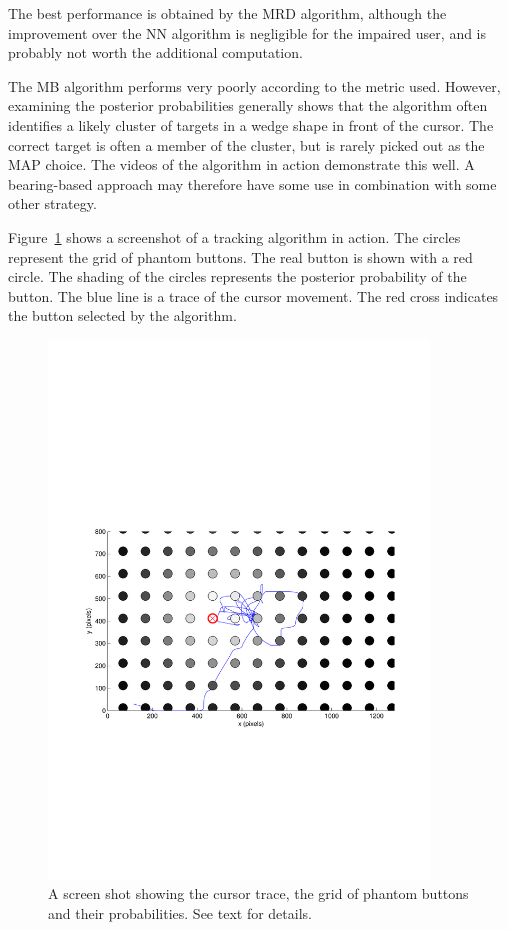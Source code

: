 The best performance is obtained by the MRD algorithm, although the improvement over the NN algorithm is negligible for the impaired user, and is probably not worth the additional computation.

The MB algorithm performs very poorly according to the metric used. However, examining the posterior probabilities generally shows that the algorithm often identifies a likely cluster of targets in a wedge shape in front of the cursor. The correct target is often a member of the cluster, but is rarely picked out as the MAP choice. The videos of the algorithm in action demonstrate this well. A bearing-based approach may therefore have some use in combination with some other strategy.

Figure~\ref{fig:CursorTracking} shows a screenshot of a tracking algorithm in action. The circles represent the grid of phantom buttons. The real button is shown with a red circle. The shading of the circles represents the posterior probability of the button. The blue line is a trace of the cursor movement. The red cross indicates the button selected by the algorithm.

\begin{figure}[hbt]
\centering \includegraphics[width=0.9\textwidth]{MovieScreenshot.pdf}
\caption{A screen shot showing the cursor trace, the grid of phantom buttons and their probabilities. See text for details.}
\label{fig:CursorTracking}
\end{figure}



